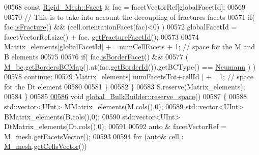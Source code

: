 \begin{DoxyCode}
00568                 \textcolor{keyword}{const} \hyperlink{classFVCode3D_1_1Rigid__Mesh_1_1Facet}{Rigid\_Mesh::Facet} & fac = facetVectorRef[globalFacetId];
00569                         
00570                 \textcolor{comment}{// This is to take into account the decoupling of fractures facets}
00571                 \textcolor{keywordflow}{if}( fac.\hyperlink{classFVCode3D_1_1Rigid__Mesh_1_1Facet_aed3f579d52847e839501f647e90c35ab}{isFracture}() && (cell.orientationFacet(fac)<0) )
00572                         globalFacetId = facetVectorRef.size() + fac.
      \hyperlink{classFVCode3D_1_1Rigid__Mesh_1_1Facet_a08dc369eccd02b29133187cede7511eb}{getFractureFacetId}();
00573 
00574                 Matrix\_elements[globalFacetId] += numCellFacets + 1;            \textcolor{comment}{// space for the M and B
       elements}
00575                 
00576                 \textcolor{keywordflow}{if}( fac.\hyperlink{classFVCode3D_1_1Rigid__Mesh_1_1Facet_af84dc398fca7867ff763bfca119ddc16}{isBorderFacet}() &&
00577                 ( \hyperlink{classFVCode3D_1_1global__InnerProduct_a62bbb87bc4710a73980603b8b77ffda8}{M\_bc}.\hyperlink{classFVCode3D_1_1BoundaryConditions_a5b53a81bdab88709fae14892bfe6a7c9}{getBordersBCMap}().at(fac.\hyperlink{classFVCode3D_1_1Rigid__Mesh_1_1Facet_a528828e73f43ae6fa5c858ecc5ab5a65}{getBorderId}()).getBCType() ==
       \hyperlink{namespaceFVCode3D_a73660061f11f1671164ce171a053f8c5a30212425b27314b01b40f4984dbf850a}{Neumann} ) )
00578                         \textcolor{keywordflow}{continue};
00579                 Matrix\_elements[ numFacetsTot+cellId ] += 1;                    \textcolor{comment}{// space fot the Dt element}
00580                 
00581         \}
00582     \}
00583     S.reserve(Matrix\_elements); 
00584 \}
00585 
\hypertarget{global__operator_8cpp_source.tex_l00586}{}\hyperlink{classFVCode3D_1_1global__BulkBuilder_a39e4c88b8703afc8a9f058301a9cb61a}{00586} \textcolor{keywordtype}{void} \hyperlink{classFVCode3D_1_1global__BulkBuilder_a39e4c88b8703afc8a9f058301a9cb61a}{global\_BulkBuilder::reserve\_space}() 
00587 \{
00588         std::vector<UInt> MMatrix\_elements(M.cols(),0);
00589         std::vector<UInt> BMatrix\_elements(B.cols(),0);
00590         std::vector<UInt> DtMatrix\_elements(Dt.cols(),0);
00591         
00592         \textcolor{keyword}{auto} & facetVectorRef   = \hyperlink{classFVCode3D_1_1global__Operator_a027911d0f801f6f19a3006329ec30a7f}{M\_mesh}.\hyperlink{classFVCode3D_1_1Rigid__Mesh_a6d3cdd4ef8a5225599953179d5302636}{getFacetsVector}();
00593         
00594         \textcolor{keywordflow}{for} (\textcolor{keyword}{auto}& cell : \hyperlink{classFVCode3D_1_1global__Operator_a027911d0f801f6f19a3006329ec30a7f}{M\_mesh}.\hyperlink{classFVCode3D_1_1Rigid__Mesh_afefb62f2c37317402b495e2369ed495b}{getCellsVector}())

\end{DoxyCode}
